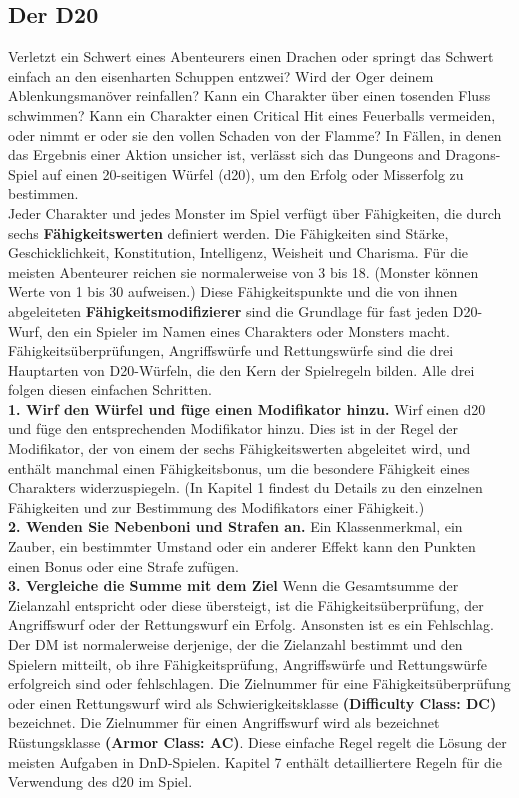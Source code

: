 \subsection{Der D20}
Verletzt ein Schwert eines Abenteurers einen Drachen oder springt das Schwert einfach an den eisenharten Schuppen entzwei? Wird der Oger deinem Ablenkungsmanöver reinfallen? Kann ein Charakter über einen tosenden Fluss schwimmen? Kann ein Charakter einen Critical Hit eines Feuerballs vermeiden, oder nimmt er oder sie den vollen Schaden von der Flamme? In Fällen, in denen das Ergebnis einer Aktion unsicher ist, verlässt sich das Dungeons and Dragons-Spiel auf einen 20-seitigen Würfel (d20), um den Erfolg oder Misserfolg zu bestimmen.\\
Jeder Charakter und jedes Monster im Spiel verfügt über Fähigkeiten, die durch sechs \textbf{Fähigkeitswerten} definiert werden. Die Fähigkeiten sind Stärke, Geschicklichkeit, Konstitution, Intelligenz, Weisheit und Charisma. Für die meisten Abenteurer reichen sie normalerweise von 3 bis 18. (Monster können Werte von 1 bis 30 aufweisen.) Diese Fähigkeitspunkte und die von ihnen abgeleiteten \textbf{Fähigkeitsmodifizierer} sind die Grundlage für fast jeden D20-Wurf, den ein Spieler im Namen eines Charakters oder Monsters macht. Fähigkeitsüberprüfungen, Angriffswürfe und Rettungswürfe sind die drei Hauptarten von D20-Würfeln, die den Kern der Spielregeln bilden. Alle drei folgen diesen einfachen Schritten.\\
\textbf{1. Wirf den Würfel und füge einen Modifikator hinzu.}
Wirf einen d20 und füge den entsprechenden Modifikator hinzu. Dies ist in der Regel der Modifikator, der von einem der sechs Fähigkeitswerten abgeleitet wird, und enthält manchmal einen Fähigkeitsbonus, um die besondere Fähigkeit eines Charakters widerzuspiegeln. (In Kapitel 1 findest du Details zu den einzelnen Fähigkeiten und zur Bestimmung des Modifikators einer Fähigkeit.)\\
\textbf{2. Wenden Sie Nebenboni und Strafen an.} Ein Klassenmerkmal, ein Zauber, ein bestimmter Umstand oder ein anderer Effekt kann den Punkten einen Bonus oder eine Strafe zufügen.\\
\textbf{3. Vergleiche die Summe mit dem Ziel} Wenn die Gesamtsumme der Zielanzahl entspricht oder diese übersteigt, ist die Fähigkeitsüberprüfung, der Angriffswurf oder der Rettungswurf ein Erfolg. Ansonsten ist es ein Fehlschlag. Der DM ist normalerweise derjenige, der die Zielanzahl bestimmt und den Spielern mitteilt, ob ihre Fähigkeitsprüfung, Angriffswürfe und Rettungswürfe erfolgreich sind oder fehlschlagen. Die Zielnummer für eine Fähigkeitsüberprüfung oder einen Rettungswurf wird als Schwierigkeitsklasse \textbf{(Difficulty Class: DC)} bezeichnet. Die Zielnummer für einen Angriffswurf wird als bezeichnet
Rüstungsklasse \textbf{(Armor Class: AC)}. Diese einfache Regel regelt die Lösung der meisten Aufgaben in DnD-Spielen. Kapitel 7 enthält detailliertere Regeln für die Verwendung des d20 im Spiel.
